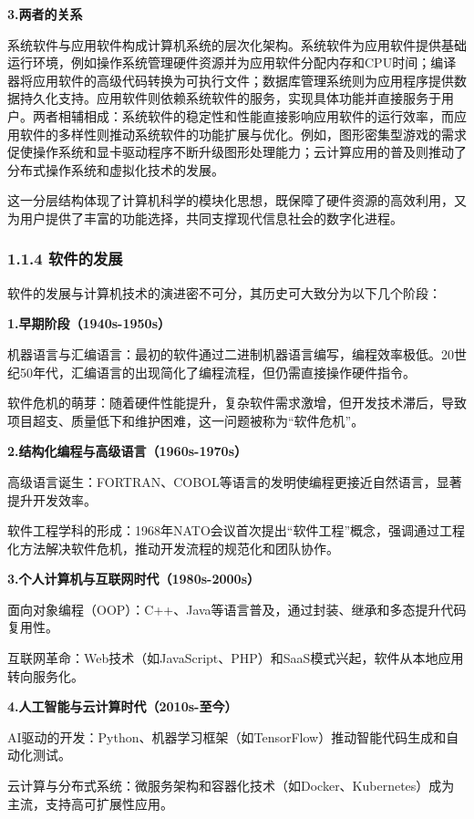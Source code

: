 \textbf{3.两者的关系}

系统软件与应用软件构成计算机系统的层次化架构。系统软件为应用软件提供基础运行环境，例如操作系统管理硬件资源并为应用软件分配内存和CPU时间；编译器将应用软件的高级代码转换为可执行文件；数据库管理系统则为应用程序提供数据持久化支持。应用软件则依赖系统软件的服务，实现具体功能并直接服务于用户。两者相辅相成：系统软件的稳定性和性能直接影响应用软件的运行效率，而应用软件的多样性则推动系统软件的功能扩展与优化。例如，图形密集型游戏的需求促使操作系统和显卡驱动程序不断升级图形处理能力；云计算应用的普及则推动了分布式操作系统和虚拟化技术的发展。

这一分层结构体现了计算机科学的模块化思想，既保障了硬件资源的高效利用，又为用户提供了丰富的功能选择，共同支撑现代信息社会的数字化进程。

\subsubsection{1.1.4 软件的发展}\label{ux8f6fux4ef6ux7684ux53d1ux5c55}

软件的发展与计算机技术的演进密不可分，其历史可大致分为以下几个阶段：

\textbf{1.早期阶段（1940s-1950s）}

机器语言与汇编语言：最初的软件通过二进制机器语言编写，编程效率极低。20世纪50年代，汇编语言的出现简化了编程流程，但仍需直接操作硬件指令。

软件危机的萌芽：随着硬件性能提升，复杂软件需求激增，但开发技术滞后，导致项目超支、质量低下和维护困难，这一问题被称为``软件危机''。

\textbf{2.结构化编程与高级语言（1960s-1970s）}

高级语言诞生：FORTRAN、COBOL等语言的发明使编程更接近自然语言，显著提升开发效率。

软件工程学科的形成：1968年NATO会议首次提出``软件工程''概念，强调通过工程化方法解决软件危机，推动开发流程的规范化和团队协作。

\textbf{3.个人计算机与互联网时代（1980s-2000s）}

面向对象编程（OOP）：C++、Java等语言普及，通过封装、继承和多态提升代码复用性。

互联网革命：Web技术（如JavaScript、PHP）和SaaS模式兴起，软件从本地应用转向服务化。

\textbf{4.人工智能与云计算时代（2010s-至今）}

AI驱动的开发：Python、机器学习框架（如TensorFlow）推动智能代码生成和自动化测试。

云计算与分布式系统：微服务架构和容器化技术（如Docker、Kubernetes）成为主流，支持高可扩展性应用。


